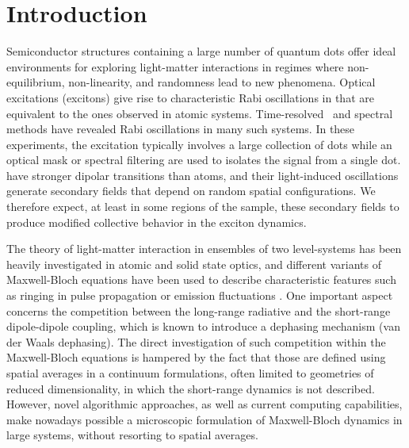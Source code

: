 \section{\label{sec:introduction}Introduction}
Semiconductor structures containing a large number of quantum dots offer ideal environments for exploring light-matter interactions in regimes where non-equilibrium, non-linearity, and randomness lead to new phenomena.
Optical excitations (excitons) give rise to characteristic Rabi oscillations in \qds{} that are equivalent to the ones observed in atomic systems.
Time-resolved~\cite{Stievater2001,shih} and spectral~\cite{kamada} methods have revealed Rabi oscillations in many such systems.
In these experiments, the excitation typically involves a large collection of dots while an optical mask or spectral filtering are used to isolates the signal from a single dot.
\Qds{} have stronger dipolar transitions than atoms, and their light-induced oscillations generate secondary fields that depend on random spatial configurations.
We therefore expect, at least in some regions of the sample, these secondary fields to produce modified collective behavior in the exciton dynamics.

The theory of light-matter interaction in ensembles of two level-systems has been heavily investigated in atomic and solid state optics, and different variants of Maxwell-Bloch equations \cite{Gross1982} have been used to describe characteristic features such as ringing in pulse propagation \cite{Burnham-Chiao PR 188 667 1969,MacGillivray1976} or emission fluctuations \cite{Haake1979}.
One important aspect concerns the competition between the long-range radiative and the short-range dipole-dipole coupling\cite{Coffey1978}, which is known to introduce a dephasing mechanism (van der Waals dephasing\cite{Gross1982}).
The direct investigation of such competition within the Maxwell-Bloch equations is hampered by the fact that those are defined using spatial averages in a continuum formulations, often limited to geometries of reduced dimensionality, in which the short-range dynamics is not described.
However, novel algorithmic approaches, as well as current computing capabilities, make nowadays possible a microscopic formulation of Maxwell-Bloch dynamics in large systems, without resorting to spatial averages.


